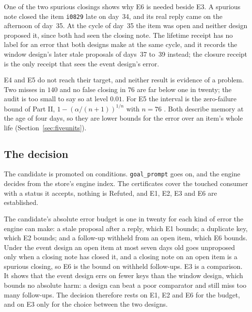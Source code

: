 \documentclass[11pt]{article}
\newcommand{\code}[1]{\texttt{#1}}
\theoremstyle{definition}
\theoremstyle{plain}
\begin{document}
One of the two spurious closings shows why E6 is needed beside E3. A spurious note closed the item
\code{i0829} late on day~34, and its real reply came on the afternoon of day~35. At the cycle of
day~35 the item was open and neither design proposed it, since both had seen the closing note. The
lifetime receipt has no label for an error that both designs make at the same cycle, and it records
the window design's later stale proposals of days~37 to~39 instead; the closure receipt is the only
receipt that sees the event design's error.

E4 and E5 do not reach their target, and neither result is evidence of a problem. Two misses in
$140$ and no false closing in $76$ are far below one in twenty; the audit is too small to say so at
level $0.01$. For E5 the interval is the zero-failure bound of Part II, $1-(\alpha/(n+1))^{1/n}$
with $n=76$ \cite[Section~5.3]{part2}. Both describe memory at the age of four days, so they are
lower bounds for the error over an item's whole life (Section~\ref{sec:fiveunits}).

\subsection{The decision}\label{sec:decision}

The candidate is promoted on conditions. \code{goal\_prompt} goes on, and the engine decides from
the store's engine index. The certificates cover the touched consumer with a status it accepts,
nothing is Refuted, and E1, E2, E3 and E6 are established.

The candidate's absolute error budget is one in twenty for each kind of error the engine can make:
a stale proposal after a reply, which E1 bounds; a duplicate key, which E2 bounds; and a follow-up
withheld from an open item, which E6 bounds. Under the event design an open item at most seven days
old goes unproposed only when a closing note has closed it, and a closing note on an open item is a
spurious closing, so E6 is the bound on withheld follow-ups. E3 is a comparison. It shows that the
event design errs on fewer keys than the window design, which bounds no absolute harm: a design can
beat a poor comparator and still miss too many follow-ups. The decision therefore rests on E1, E2
and E6 for the budget, and on E3 only for the choice between the two designs.
\end{document}
